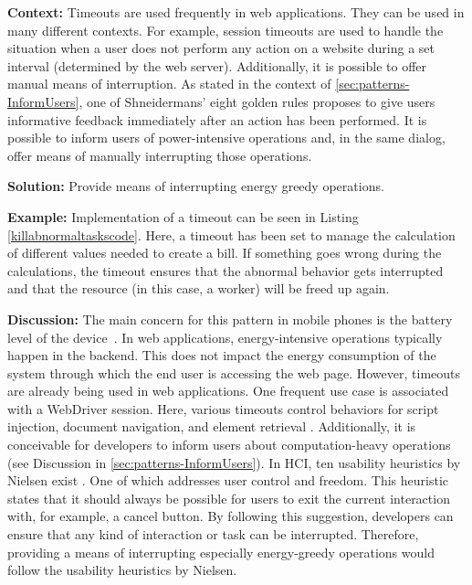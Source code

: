 \textbf{Context:} Timeouts are used frequently in web applications. They can be used in many different contexts. For example, session timeouts are used to handle the situation when a user does not perform any action on a website during a set interval (determined by the web server). Additionally, it is possible to offer manual means of interruption. As stated in the context of \ref{sec:patterns-InformUsers}, one of Shneidermans' eight golden rules proposes to give users informative feedback immediately after an action has been performed. It is possible to inform users of power-intensive operations and, in the same dialog, offer means of manually interrupting those operations.

\textbf{Solution:} Provide means of interrupting energy greedy operations.

\textbf{Example:} Implementation of a timeout can be seen in Listing \ref{killabnormaltaskscode}. Here, a timeout has been set to manage the calculation of different values needed to create a bill. If something goes wrong during the calculations, the timeout ensures that the abnormal behavior gets interrupted and that the resource (in this case, a worker) will be freed up again.




\textbf{Discussion:} The main concern for this pattern in mobile phones is the battery level of the device~\cite{cruz2019catalog}. In web applications, energy-intensive operations typically happen in the backend. This does not impact the energy consumption of the system through which the end user is accessing the web page. 
However, timeouts are already being used in web applications. One frequent use case is associated with a WebDriver session. Here, various timeouts control behaviors for script injection, document navigation, and element retrieval \cite{dev-mozilla-timeouts}.  Additionally, it is conceivable for developers to inform users about computation-heavy operations (see Discussion in \ref{sec:patterns-InformUsers}). In HCI, ten usability heuristics by Nielsen exist \cite{nielsen1995ten}. One of which addresses user control and freedom. This heuristic states that it should always be possible for users to exit the current interaction with, for example, a cancel button. By following this suggestion, developers can ensure that any kind of interaction or task can be interrupted. Therefore, providing a means of interrupting especially energy-greedy operations would follow the usability heuristics by Nielsen.


